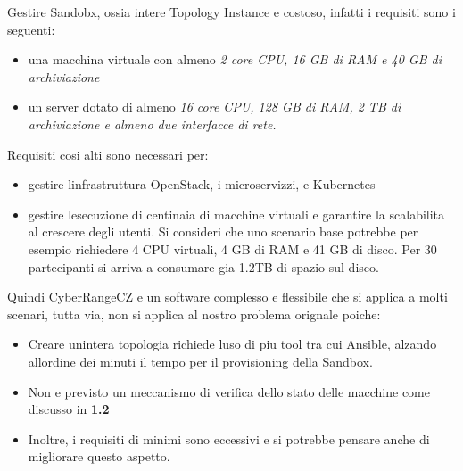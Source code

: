 Gestire Sandobx, ossia intere Topology Instance e\textquotesingle{}
costoso, infatti i requisiti sono i seguenti:

\begin{itemize}
\tightlist
\item
  una macchina virtuale con almeno \emph{2 core CPU, 16 GB di RAM e 40
  GB di archiviazione}
\item
  un server dotato di almeno \emph{16 core CPU, 128 GB di RAM, 2 TB di
  archiviazione e almeno due interfacce di rete.}
\end{itemize}

Requisiti cosi alti sono necessari per:

\begin{itemize}
\tightlist
\item
  gestire l\textquotesingle infrastruttura OpenStack, i microservizzi, e
  Kubernetes
\item
  gestire l\textquotesingle esecuzione di centinaia di macchine virtuali
  e garantire la scalabilita al crescere degli utenti. Si consideri che
  uno scenario base potrebbe per esempio richiedere 4 CPU virtuali, 4 GB
  di RAM e 41 GB di disco. Per 30 partecipanti si arriva a consumare gia
  1.2TB di spazio sul disco.
\end{itemize}

Quindi CyberRangeCZ e\textquotesingle{} un software complesso e
flessibile che si applica a molti scenari, tutta via, non si applica al
nostro problema orignale poiche:

\begin{itemize}
\tightlist
\item
  Creare un\textquotesingle intera topologia richiede
  l\textquotesingle uso di piu tool tra cui Ansible, alzando
  all\textquotesingle ordine dei minuti il tempo per il provisioning
  della Sandbox.
\item
  Non e\textquotesingle{} previsto un meccanismo di verifica dello stato
  delle macchine come discusso in \textbf{1.2}
\item
  Inoltre, i requisiti di minimi sono eccessivi e si potrebbe pensare
  anche di migliorare questo aspetto.
\end{itemize}
